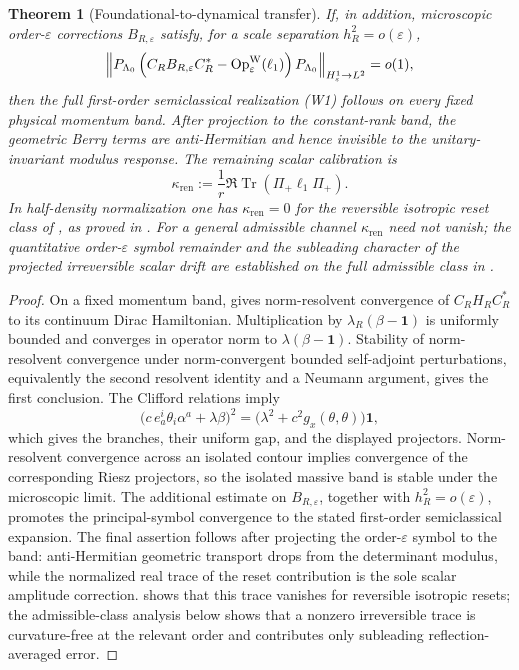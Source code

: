 \documentclass[11pt]{article}
\newtheorem{theorem}{Theorem}[section]
\theoremstyle{definition}
\theoremstyle{remark}
\newcommand{\eps}{\varepsilon}
\newcommand{\Tr}{\operatorname{Tr}}
\newcommand{\ren}{\mathrm{ren}}
\begin{document}
\begin{theorem}[Foundational-to-dynamical transfer]
If, in addition, microscopic order-$\eps$ corrections $B_{R,\eps}$ satisfy,
for a scale separation $h_R^2=o(\eps)$,
\[
 \left\|P_{\Lambda_0}\left(
 C_RB_{R,\eps}C_R^*-\operatorname{Op}^{\rm W}_\eps(\ell_1)
 \right)P_{\Lambda_0}\right\|_{H^1_\eps\to L^2}=o(1),
\]
then the full first-order semiclassical realization \textup{(W1)} follows on
every fixed physical momentum band.  After projection to the constant-rank band,
the geometric Berry terms are anti-Hermitian and hence invisible to the
unitary-invariant modulus response.  The remaining scalar calibration is
\[
  \kappa_{\ren}:=\frac1r\Re\Tr(\Pi_+\ell_1\Pi_+).
\]
In half-density normalization one has \(\kappa_{\ren}=0\) for the reversible
isotropic reset class of , as proved in
.  For a general admissible channel
\(\kappa_{\ren}\) need not vanish; the quantitative order-\(\eps\) symbol
remainder and the subleading character of the projected irreversible scalar
drift are established on the full admissible class in
.
\end{theorem}

\begin{proof}
On a fixed momentum band,  gives norm-resolvent
convergence of $C_RH_RC_R^*$ to its continuum Dirac Hamiltonian.  Multiplication
by $\lambda_R(\beta-\mathbf 1)$ is uniformly bounded and converges in operator
norm to $\lambda(\beta-\mathbf 1)$.  Stability of norm-resolvent convergence under
norm-convergent bounded self-adjoint perturbations, equivalently the second
resolvent identity and a Neumann argument, gives the first conclusion.  The
Clifford relations imply
\[
 \bigl(c\,e_a^i\theta_i\alpha^a+\lambda\beta\bigr)^2
 =\bigl(\lambda^2+c^2g_x(\theta,\theta)\bigr)\mathbf 1,
\]
which gives the branches, their uniform gap, and the displayed projectors.
Norm-resolvent convergence across an isolated contour implies convergence of the
corresponding Riesz projectors, so the isolated massive band is stable under the
microscopic limit.  The additional estimate on $B_{R,\eps}$, together with
$h_R^2=o(\eps)$, promotes the principal-symbol convergence to the stated
first-order semiclassical expansion.  The final assertion follows after projecting the order-\(\eps\) symbol to the
band: anti-Hermitian geometric transport drops from the determinant modulus,
while the normalized real trace of the reset contribution is the sole scalar
amplitude correction.   shows that this trace
vanishes for reversible isotropic resets; the admissible-class analysis below
shows that a nonzero irreversible trace is curvature-free at the relevant
order and contributes only subleading reflection-averaged error.
\end{proof}
\end{document}

